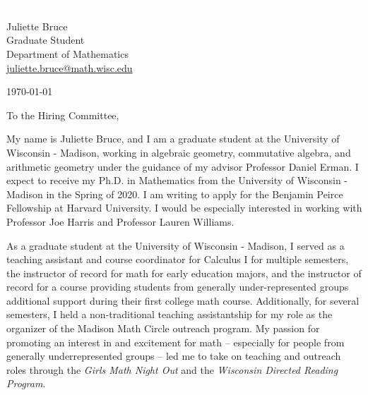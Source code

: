 \documentclass[11pt]{article}
\begin{document}
\section*{}

\noindent
\begin{minipage}{0.99\textwidth}
\begin{minipage}{0.69\textwidth}
\textcolor{white}{.}
\end{minipage}
\begin{minipage}{0.29\textwidth}
{
Juliette Bruce \\
Graduate Student \\
Department of Mathematics \\
\href{mailto:juliette.bruce@math.wisc.edu}{juliette.bruce@math.wisc.edu}
}

\vspace{12pt}
\today
\end{minipage}
\end{minipage}


\vspace{12pt}
\noindent
To the Hiring Committee,

My name is Juliette Bruce, and I am a graduate student at the University of Wisconsin - Madison, working in algebraic geometry, commutative algebra, and arithmetic geometry under the guidance of my advisor Professor Daniel Erman. I expect to receive my Ph.D. in Mathematics from the University of Wisconsin - Madison in the Spring of 2020. I am writing to apply for the Benjamin Peirce Fellowship at Harvard University. I would be especially interested in working with Professor Joe Harris and Professor Lauren Williams. 

As a graduate student at the University of Wisconsin - Madison, I served as a teaching assistant and course coordinator for Calculus I for multiple semesters, the instructor of record for math for early education majors, and the instructor of record for a course providing students from generally under-represented groups additional support during their first college math course. Additionally, for several semesters, I held a non-traditional teaching assistantship for my role as the organizer of the Madison Math Circle outreach program. My passion for promoting an interest in and excitement for math -- especially for people from generally underrepresented groups -- led me to take on teaching and outreach roles through the \textit{Girls Math Night Out} and the \textit{Wisconsin Directed Reading Program}. 
\end{document}
